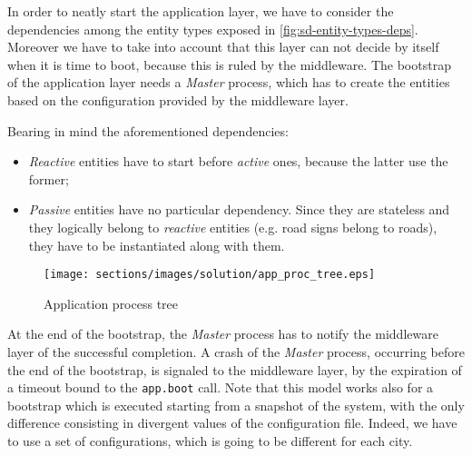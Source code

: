 In order to neatly start the application layer, we have to consider the 
dependencies among the entity types exposed in \ref{fig:sd-entity-types-deps}. 
Moreover we have to take into account that this layer can not decide by itself 
when it is time to boot, because this is ruled by the middleware.
The bootstrap of the application layer needs a \textit{Master} process,
which has to create the entities based on the configuration provided by 
the middleware layer.

Bearing in mind the aforementioned dependencies:
\begin{itemize}
  \item \textit{Reactive} entities have to start before \textit{active} 
ones, because the latter use the former; 
  \item \textit{Passive} entities have no particular dependency. Since 
they are stateless and they logically belong to \textit{reactive} entities 
(e.g. road signs belong to roads), they have to be instantiated along with them.
\end{itemize}

\begin{figure}[H]
  \centering
  \texttt{[image: sections/images/solution/app\_proc\_tree.eps]}
  \caption{Application process tree}
  \label{fig:app-proc-tree}
\end{figure}

At the end of the bootstrap, the \textit{Master} process has to notify the 
middleware layer of the successful completion. A crash of the
\textit{Master} process, occurring before the end of the bootstrap, 
is signaled to the middleware layer, by the expiration of a timeout bound to
the \texttt{app.boot} call. 
Note that this model works also for a bootstrap which is executed starting 
from a snapshot of the system, with the only difference consisting in divergent
values of the configuration file. Indeed, we have to use a set of 
configurations, which is going to be different for each city.